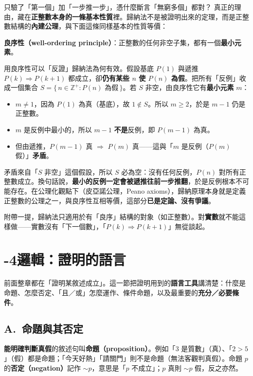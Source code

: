\documentclass[11pt]{article}
\begin{document}
\begin{延伸框}{只驗了「第一個」加「一步推一步」，憑什麼斷言「無窮多個」都對？}
真正的理由，藏在\textbf{正整數本身的一條基本性質}裡。歸納法不是被證明出來的定理，而是正整數結構的\textbf{內建公理}，與下面這條同樣基本的性質等價：

\textbf{良序性（well-ordering principle）}：正整數的任何非空子集，都有一個\textbf{最小元素}。

用良序性可以「反證」歸納法為何有效。假設基底 $P(1)$ 與遞推 $P(k)\Rightarrow P(k+1)$ 都成立，卻\textbf{仍有某些 $n$ 使 $P(n)$ 為假}。把所有「反例」收成一個集合 $S=\{\,n\in\mathbb{Z}^+ : P(n)\text{ 為假}\,\}$。若 $S$ 非空，由良序性它有\textbf{最小元素} $m$：

\begin{itemize}\setlength{\itemsep}{1pt}
\item $m\neq1$，因為 $P(1)$ 為真（基底），故 $1\notin S$。所以 $m\ge2$，於是 $m-1$ 仍是正整數。
\item $m$ 是反例中最小的，所以 $m-1$ \textbf{不是}反例，即 $P(m-1)$ 為真。
\item 但由遞推，$P(m-1)$ 真 $\Rightarrow$ $P(m)$ 真——這與「$m$ 是反例（$P(m)$ 假）」\textbf{矛盾}。
\end{itemize}

矛盾來自「$S$ 非空」這個假設，所以 $S$ 必為空：沒有任何反例，$P(n)$ 對所有正整數成立。換句話說，\textbf{最小的反例一定會被遞推往前一步推翻}，於是反例根本不可能存在。在公理化觀點下（皮亞諾公理，Peano axioms），歸納原理本身就是定義正整數的公理之一，與良序性互相等價，這部分\textbf{已是定論、沒有爭議}。

附帶一提，歸納法只適用於有「良序」結構的對象（如正整數）。對\textbf{實數}就不能這樣做——實數沒有「下一個數」，「$P(k)\Rightarrow P(k+1)$」無從談起。
\end{延伸框}

\section*{-4\quad 邏輯：證明的語言}

前面整章都在「證明某敘述成立」。這一節把證明用到的\textbf{語言工具}講清楚：什麼是命題、怎麼否定、「且／或」怎麼運作、條件命題，以及最重要的\textbf{充分／必要條件}。

\subsection*{\sffamily A.\ 命題與其否定}

\textbf{能明確判斷真假}的敘述句叫\textbf{命題（proposition）}。例如「$3$ 是質數」（真）、「$2>5$」（假）都是命題；「今天好熱」「請關門」則不是命題（無法客觀判真假）。命題 $p$ 的\textbf{否定（negation）}記作 $\sim p$，意思是「$p$ 不成立」；$p$ 真則 $\sim p$ 假，反之亦然。
\end{document}
